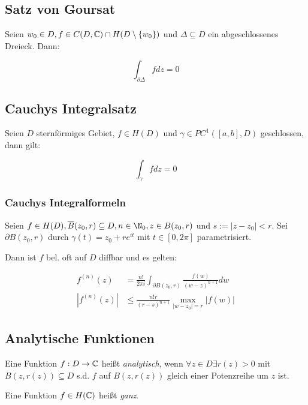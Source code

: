 \subsection*{Satz von Goursat}

Seien $w_0 \in D, f \in C(D,\mathbb{C}) \cap H(D \setminus \{w_0\})$ und $\Delta \subseteq D$ ein abgeschlossenes Dreieck. Dann:

\vspace*{-2mm}
$$\int_{\partial\Delta} f dz = 0$$

\subsection*{Cauchys Integralsatz}

Seien $D$ sternförmiges Gebiet, $f \in H(D)$ und $\gamma \in PC^1([a,b],D)$ geschlossen, dann gilt:

\vspace*{-2mm}
$$\int_\gamma f dz = 0$$

\subsubsection*{Cauchys Integralformeln}

Seien $f \in H(D), \overline B(z_0,r) \subseteq D, n \in \N_0, z \in B(z_0,r)$ und $s := |z-z_0| < r$. Sei $\partial B(z_0,r)$ durch $\gamma(t) = z_0 + re^{it}$ mit $t \in [0,2\pi]$ parametrisiert.

Dann ist $f$ bel. oft auf $D$ diffbar und es gelten:

\vspace*{-4mm}
\begin{align*}
	f^{(n)}(z) &= \frac{n!}{2\pi i} \int_{\partial B(z_0,r)} \frac{f(w)}{(w-z)^{n+1}} dw \\
	|f^{(n)}(z)| &\leq \frac{n!r}{(r-s)^{n+1}} \max_{|w-z_0|=r} |f(w)|
\end{align*}

\subsection*{Analytische Funktionen}

Eine Funktion $f : D \to \mathbb{C}$ heißt \emph{analytisch}, wenn $\forall z \in D \exists r(z) > 0$ mit $B(z,r(z)) \subseteq D$ s.d. $f$ auf $B(z,r(z))$ gleich einer Potenzreihe um $z$ ist.

\vspace*{1mm}

Eine Funktion $f \in H(\mathbb{C})$ heißt \emph{ganz}.

